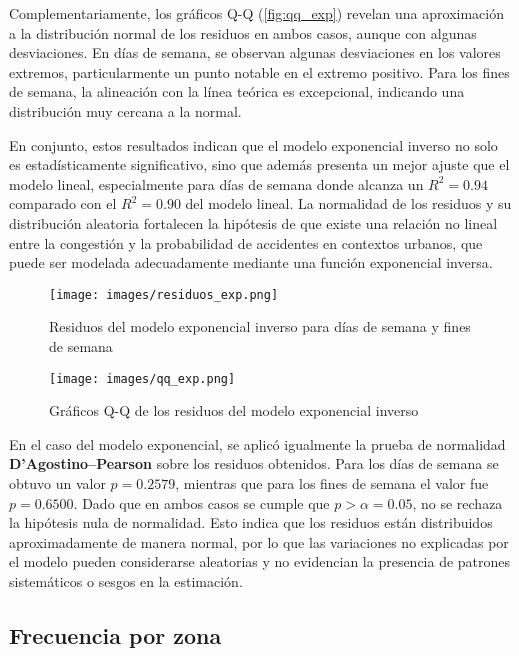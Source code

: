 \documentclass[12pt]{article}
\begin{document}
Complementariamente, los gráficos Q-Q (\autoref{fig:qq_exp}) revelan una aproximación a la distribución normal de los residuos en ambos casos, aunque con algunas desviaciones. En días de semana, se observan algunas desviaciones en los valores extremos, particularmente un punto notable en el extremo positivo. Para los fines de semana, la alineación con la línea teórica es excepcional, indicando una distribución muy cercana a la normal.

En conjunto, estos resultados indican que el modelo exponencial inverso no solo es estadísticamente significativo, sino que además presenta un mejor ajuste que el modelo lineal, especialmente para días de semana donde alcanza un $R^2 = 0.94$ comparado con el $R^2 = 0.90$ del modelo lineal. La normalidad de los residuos y su distribución aleatoria fortalecen la hipótesis de que existe una relación no lineal entre la congestión y la probabilidad de accidentes en contextos urbanos, que puede ser modelada adecuadamente mediante una función exponencial inversa.


\begin{figure}[H]
\centering
\texttt{[image: images/residuos\_exp.png]}
\caption{Residuos del modelo exponencial inverso para días de semana y fines de semana}
\label{fig:resid_exp}
\end{figure}

\begin{figure}[H]
\centering
\texttt{[image: images/qq\_exp.png]}
\caption{Gráficos Q-Q de los residuos del modelo exponencial inverso}
\label{fig:qq_exp}
\end{figure}

En el caso del modelo exponencial, se aplicó igualmente la prueba de normalidad \textbf{D'Agostino–Pearson} sobre los residuos obtenidos. Para los días de semana se obtuvo un valor $p = 0.2579$, mientras que para los fines de semana el valor fue $p = 0.6500$. Dado que en ambos casos se cumple que $p > \alpha = 0.05$, no se rechaza la hipótesis nula de normalidad. Esto indica que los residuos están distribuidos aproximadamente de manera normal, por lo que las variaciones no explicadas por el modelo pueden considerarse aleatorias y no evidencian la presencia de patrones sistemáticos o sesgos en la estimación.

\subsection{Frecuencia por zona} \label{ssec:freq_zone}
\end{document}
